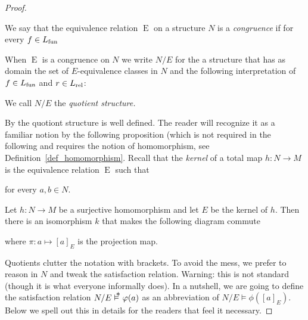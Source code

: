 \begin{proof}
\begin{definition}\label{def_congruence}
We say that the equivalence relation $\mathrel{E}$ on a structure $N$ is a \emph{congruence\/} if for every $f\in L_{\rm fun}$


When $\mathrel{E}$ is a congruence on $N$ we write \emph{$N/E$\/} for the a structure that has as domain the set of $E$-equivalence classes in $N$ and the following interpretation of $f\in L_{\rm fun}$ and $r\in L_{\rm rel}$:



We call $N/E$ the \emph{quotient structure.}
\end{definition}


By  the quotiont structure is well defined.
The reader will recognize it as a familiar notion by the following proposition (which is not required in the following and requires the notion of homomorphism, see Definition~\ref{def_homomorphism}.
Recall that the \emph{kernel\/} of a total map $h:N\to M$ is the equivalence relation $\mathrel{E}$ such that


for every $a,b\in N$.

\begin{proposition}
Let $h:N\to M$ be a surjective homomorphism and let $E$ be the kernel of $h$.
Then there is an isomorphism $k$ that makes the following diagram commute

\hspace*{25ex}

where $\pi:a\mapsto [a]_E$ is the projection map.
\end{proposition}

\noindent\llap{\textcolor{red}{\Large\danger}\kern1.5ex}Quotients clutter the notation with brackets.
To avoid the mess, we prefer to reason in $N$ and tweak the satisfaction relation.
Warning: this is not standard (though it is what everyone informally does).
In a nutshell, we are going to define the satisfaction relation $N/E\pmodels\phi(a)$ as an abbreviation of $N/E\models\phi([a]_E)$.
Below we spell out this in details for the readers that feel it necessary.


\end{proof}
